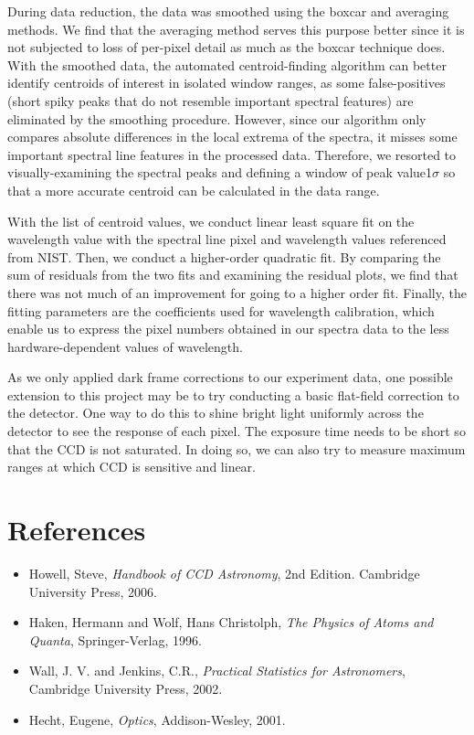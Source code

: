 \documentclass[authoryear, 12pt,5p, times]{elsarticle}
\newcommand{\rpm}{\raisebox{.2ex}{$\scriptstyle\pm$}}
\begin{document}
During data reduction, the data was smoothed using the boxcar and averaging methods. We find that the averaging method serves this purpose better since it is not subjected to loss of per-pixel detail as much as the boxcar technique does. With the smoothed data, the automated centroid-finding algorithm can better identify centroids of interest in isolated window ranges, as some false-positives (short spiky peaks that do not resemble important spectral features) are eliminated by the smoothing procedure. However, since our algorithm only compares absolute differences in the local extrema of the spectra, it misses some important spectral line features in the  processed data. Therefore, we resorted to visually-examining the spectral peaks and defining a window of peak value\rpm 1$\sigma$ so that a more accurate centroid can be calculated in the data range.

With the list of centroid values, we conduct linear least square fit on the wavelength value with the  spectral line pixel and wavelength values referenced from NIST. Then, we conduct a higher-order quadratic fit. By comparing the sum of residuals from the two fits and examining the residual plots, we find that there was not much of an improvement for going to a higher order fit. Finally, the fitting parameters are the coefficients used for wavelength calibration, which enable us to express the pixel numbers obtained in our spectra data to the less hardware-dependent values of wavelength.
	
As we only applied dark frame corrections to our experiment data, one possible extension to this project may be to try conducting a basic flat-field correction to the detector. One way to do this to shine bright light uniformly across the detector to see the response of each pixel. The exposure time needs to be short so that the CCD is not saturated. In doing so, we can also try to measure maximum ranges at which CCD is sensitive and linear.
\section{References}
%
\begin{itemize}
\item Howell, Steve,  \textit{Handbook of CCD Astronomy}, 2nd Edition. Cambridge University Press, 2006.
\item Haken, Hermann and Wolf, Hans Christolph, \textit{The Physics of Atoms and Quanta}, Springer-Verlag, 1996.
\item Wall, J. V. and Jenkins, C.R., \textit{Practical Statistics for Astronomers}, Cambridge University Press, 2002.
\item Hecht, Eugene, \textit{Optics}, Addison-Wesley, 2001.
\end{itemize}
\end{document}
